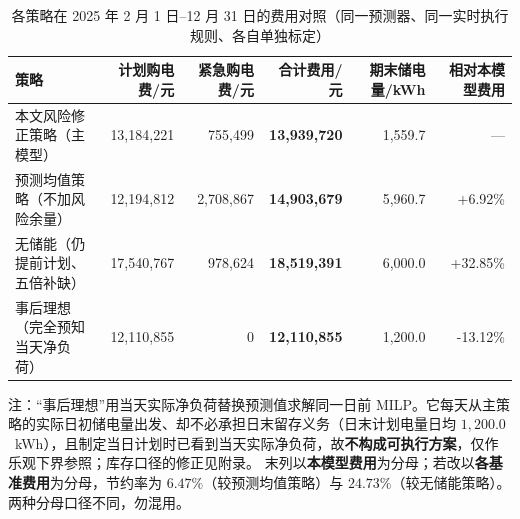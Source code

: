 
\begin{table}[htbp]
  \centering
  \caption{各策略在 2025 年 2 月 1 日--12 月 31 日的费用对照（同一预测器、同一实时执行规则、各自单独标定）}
  \label{tab:p2-strategy}
  \footnotesize
  \begin{tabular}{lrrrrr}
    \toprule
    策略 & 计划购电费/元 & 紧急购电费/元 & 合计费用/元 & 期末储电量/kWh & 相对本模型费用 \\
    \midrule
    本文风险修正策略（主模型） & 13,184,221 & 755,499 & \textbf{13,939,720} & 1,559.7 & --- \\
    预测均值策略（不加风险余量） & 12,194,812 & 2,708,867 & \textbf{14,903,679} & 5,960.7 & +6.92\% \\
    无储能（仍提前计划、五倍补缺） & 17,540,767 & 978,624 & \textbf{18,519,391} & 6,000.0 & +32.85\% \\
    事后理想（完全预知当天净负荷） & 12,110,855 & 0 & \textbf{12,110,855} & 1,200.0 & -13.12\% \\
    \bottomrule
  \end{tabular}
  \par\vspace{2pt}
  \begin{minipage}{.92\textwidth}\footnotesize
    注：“事后理想”用当天实际净负荷替换预测值求解同一日前 MILP。它每天从主策略的实际日初储电量出发、却不必承担日末留存义务（日末计划电量日均 $1,200.0$~kWh），且制定当日计划时已看到当天实际净负荷，故\textbf{不构成可执行方案}，仅作乐观下界参照；库存口径的修正见附录。 末列以\textbf{本模型费用}为分母；若改以\textbf{各基准费用}为分母，节约率为 $6.47\%$（较预测均值策略）与 $24.73\%$（较无储能策略）。两种分母口径不同，勿混用。
  \end{minipage}
\end{table}

